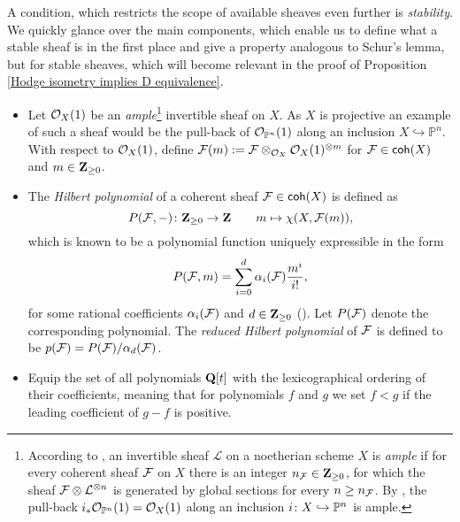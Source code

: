 A condition, which restricts the scope of available sheaves even further is \emph{stability}. We quickly glance over the main components, which enable us to define what a stable sheaf is in the first place and give a property analogous to Schur's lemma, but for stable sheaves, which will become relevant in the proof of Proposition \ref{Hodge isometry implies D equivalence}.
\begin{itemize}[label = $\vartriangleright$]
    \item{
        Let ${\mathcal{O}_{X}}(1)$ be an \emph{ample}\footnote{
            According to \cite[\S II.7]{Hartshorne1977}, an invertible sheaf $\mathcal L$ on a noetherian scheme $X$ is \emph{ample} if for every coherent sheaf $\mathcal F$ on $X$ there is an integer $n_\mathcal F \in \mathbf Z_{\geq 0}$, for which the sheaf $\mathcal F \otimes \mathcal L^{\otimes n}$ is generated by global sections for every $n \geq n_\mathcal F$. By \cite[\S II, Example 7.6.1]{Hartshorne1977}, the pull-back $i_*{\mathcal{O}_{\mathbb P^n}}(1) = {\mathcal{O}_{X}}(1)$ along an inclusion $i \colon X \hookrightarrow \mathbb P^n$ is ample. 
        } invertible sheaf on $X$. As $X$ is projective an example of such a sheaf would be the pull-back of ${\mathcal{O}_{\mathbb P^n}}(1)$ along an inclusion $X \hookrightarrow \mathbb{P}^n$. With respect to ${\mathcal{O}_{X}}(1)$, define 
        $\mathcal F(m) := \mathcal F \otimes_{{\mathcal{O}_{X}}} {\mathcal{O}_{X}}(1)^{\otimes m}$ for $\mathcal F \in \mathsf{coh}(X)$ and $m \in \mathbf Z_{\geq 0}$.
        }
    \item{
        The \emph{Hilbert polynomial} of a coherent sheaf $\mathcal F \in \mathsf{coh}(X)$ is defined as
        \[
            P(\mathcal F, -) \colon \mathbf Z_{\geq 0} \to \mathbf Z \qquad m \mapsto \chi(X, \mathcal F(m)),
        \]
        which is known to be a polynomial function uniquely expressible in the form 
        \[
            P(\mathcal F, m) = \sum_{i = 0}^d \alpha_i(\mathcal F)\frac{m^i}{i!},
        \]
        for some rational coefficients $\alpha_i(\mathcal F)$ and $d \in \mathbf Z_{\geq 0}$ (\cf \cite[\S I.1.2, Lemma 1.2.1]{HuybrechtsLehn2010}). Let $P(\mathcal F)$ denote the corresponding polynomial. The \emph{reduced Hilbert polynomial} of $\mathcal F$ is defined to be $p(\mathcal F) = P(\mathcal F)/\alpha_d(\mathcal F)$. 
    }
    \item{
        Equip the set of all polynomials $\mathbf Q[t]$ with the lexicographical ordering of their coefficients, meaning that for polynomials $f$ and $g$ we set $f < g$ if the leading coefficient of $g - f$ is positive. 
}
\end{itemize}
